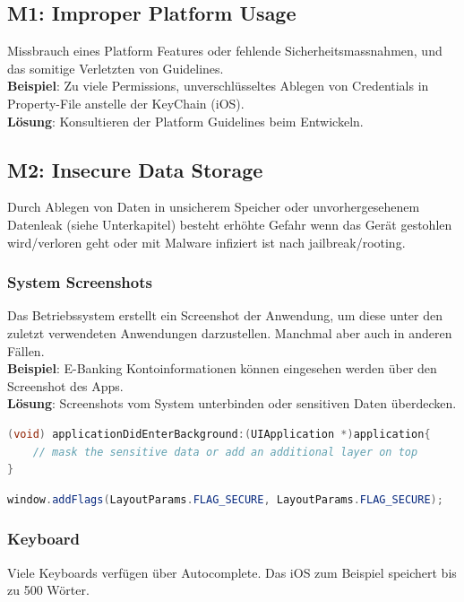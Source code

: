 \subsection{M1: Improper Platform Usage}
Missbrauch eines Platform Features oder fehlende Sicherheitsmassnahmen, und das somitige Verletzten von Guidelines. \\

\textbf{Beispiel}: Zu viele Permissions, unverschlüsseltes Ablegen von Credentials in Property-File anstelle der KeyChain (iOS). \\

\textbf{Lösung}: Konsultieren der Platform Guidelines beim Entwickeln.

\subsection{M2: Insecure Data Storage}
Durch Ablegen von Daten in unsicherem Speicher oder unvorhergesehenem Datenleak (siehe Unterkapitel) besteht erhöhte Gefahr wenn das Gerät gestohlen wird/verloren geht oder mit Malware infiziert ist nach jailbreak/rooting.

\subsubsection{System Screenshots}
Das Betriebssystem erstellt ein Screenshot der Anwendung, um diese unter den zuletzt verwendeten Anwendungen darzustellen. Manchmal aber auch in anderen Fällen.\\

\textbf{Beispiel}: E-Banking Kontoinformationen können eingesehen werden über den Screenshot des Apps. \\

\textbf{Lösung}: Screenshots vom System unterbinden oder sensitiven Daten überdecken.
\begin{lstlisting}[language=C, caption=Lösung für iOS]
(void) applicationDidEnterBackground:(UIApplication *)application{
	// mask the sensitive data or add an additional layer on top			
}
\end{lstlisting}
\begin{lstlisting}[language=Java, caption=Lösung für Android]
window.addFlags(LayoutParams.FLAG_SECURE, LayoutParams.FLAG_SECURE);
\end{lstlisting}

\subsubsection{Keyboard}
Viele Keyboards verfügen über Autocomplete. Das iOS zum Beispiel speichert bis zu 500 Wörter.\\

